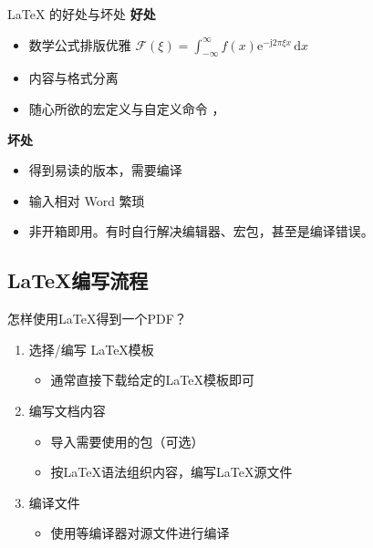 \begin{frame}[fragile]{\LaTeX{} 的好处与坏处}
    \textbf{好处}
    \begin{itemize}
        \item 数学公式排版优雅 \quad $\mathcal{F}(\xi)=\int_{-\infty}^{\infty} f(x)\mathrm{e}^{-\mathrm{j}2\pi \xi x}\,\mathrm{d}x$
        \item 内容与格式分离
        \item 随心所欲的宏定义与自定义命令 ，
    \end{itemize}

    \vspace{2em}
    \textbf{坏处}
    \begin{itemize}
        \item 得到易读的版本，需要编译
        \item 输入相对 Word 繁琐
        \item 非开箱即用。有时自行解决编辑器、宏包，甚至是编译错误。
    \end{itemize}
\end{frame}

\subsection{\LaTeX{}编写流程}
\begin{frame}[fragile]{怎样使用\LaTeX{}得到一个PDF？}
	\begin{enumerate}
		\item 选择/编写 \LaTeX{}模板
		      \begin{itemize}
			      \item 通常直接下载给定的\LaTeX{}模板即可
		      \end{itemize}
		\item 编写文档内容
		      \begin{itemize}
			      \item 导入需要使用的包（可选）
			      \item 按\LaTeX{}语法组织内容，编写\LaTeX{}源文件
		      \end{itemize}
		\item 编译文件
		      \begin{itemize}
			      \item 使用\XeLaTeX{}等编译器对源文件进行编译
		      \end{itemize}
	\end{enumerate}
\end{frame}
